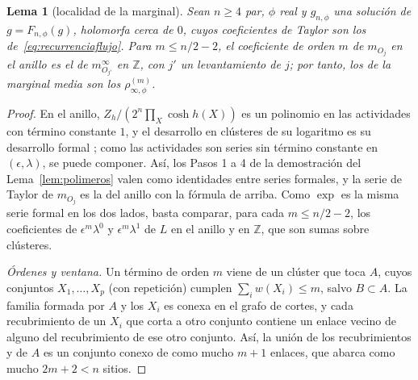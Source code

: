 \documentclass[11pt,a4paper]{article}
\newtheorem{lema}[teorema]{Lema}
\theoremstyle{remark}
\begin{document}
\begin{lema}[localidad de la marginal]\label{lem:localidad}
Sean $n\ge4$ par, $\phi$ real y $g_{n,\phi}$ una solución de $g=F_{n,\phi}(g)$, holomorfa cerca de $0$, cuyos
coeficientes de Taylor son los de~\eqref{eq:recurrenciaflujo}. Para $m\le n/2-2$, el coeficiente de
orden $m$ de $m_{O_j}$ en el anillo es el de $m^\infty_{O_{j'}}$ en $\mathbb Z$, con $j'$ un levantamiento de
$j$; por tanto, los de la marginal media son los $\rho^{(m)}_{\infty,\phi}$.
\end{lema}

\begin{proof}
En el anillo, $Z_h/(2^n\prod_X\cosh h(X))$ es un polinomio en las actividades con término constante $1$,
y el desarrollo en clústeres de su logaritmo es su desarrollo formal \cite[cap.~5]{fv}; como las
actividades son series sin término constante en $(\epsilon,\lambda)$, se puede componer. Así, los Pasos 1
a 4 de la demostración del Lema~\ref{lem:polimeros} valen como identidades entre series formales, y la
serie de Taylor de $m_{O_j}$ es la del anillo con la fórmula de arriba. Como $\exp$ es la misma serie
formal en los dos lados, basta comparar, para cada $m\le n/2-2$, los coeficientes de
$\epsilon^m\lambda^0$ y $\epsilon^m\lambda^1$ de $L$ en el anillo y en $\mathbb Z$, que son sumas sobre clústeres.

\emph{Órdenes y ventana.} Un término de orden $m$ viene de un clúster que toca $A$, cuyos conjuntos
$X_1,\dots,X_p$ (con repetición) cumplen $\sum_iw(X_i)\le m$, salvo $B\subset A$. La familia formada por
$A$ y los $X_i$ es conexa en el grafo de cortes, y cada recubrimiento de un $X_i$ que corta a otro
conjunto contiene un enlace vecino de alguno del recubrimiento de ese otro conjunto. Así, la unión de
los recubrimientos y de $A$ es un conjunto conexo de como mucho $m+1$ enlaces, que abarca como mucho
$2m+2<n$ sitios.


\end{proof}
\end{document}
